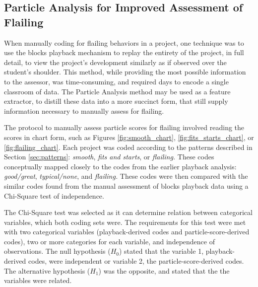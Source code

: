 \subsection{Particle Analysis for Improved Assessment of Flailing}
\label{sec:validation-particle}
When manually coding for flailing behaviors in a project, one technique was to use the blocks playback mechanism to replay the entirety of the project, in full detail, to view the project's development similarly as if observed over the student's shoulder. This method, while providing the most possible information to the assessor, was time-consuming, and required days to encode a single classroom of data. The Particle Analysis method may be used as a feature extractor, to distill these data into a more succinct form, that still supply information necessary to manually assess for flailing. 

The protocol to manually assess particle scores for flailing involved reading the scores in chart form, such as Figures \ref{fig:smooth_chart}, \ref{fig:fits_starts_chart}, or \ref{fig:flailing_chart}. Each project was coded according to the patterns described in Section \ref{sec:patterns}: \emph{smooth}, \emph{fits and starts}, or \emph{flailing.} These codes conceptually mapped closely to the codes from the earlier playback analysis: \emph{good/great}, \emph{typical/none}, and \emph{flailing.}
These codes were then compared with the similar codes found from the manual assessment of blocks playback data using a Chi-Square test of independence.

The Chi-Square test was selected as it can determine relation between categorical variables, which both coding sets were. The requirements for this test were met with two categorical variables (playback-derived codes and particle-score-derived codes), two or more categories for each variable, and independence of observations. The null hypothesis ($H_0$) stated that the variable 1, playback-derived codes, were independent or variable 2, the particle-score-derived codes. The alternative hypothesis ($H_1$) was the opposite, and stated that the the variables were related.

